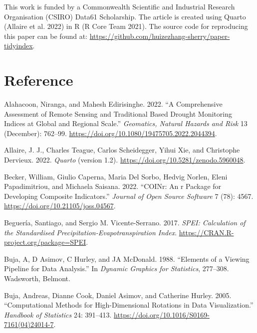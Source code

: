 \documentclass[
]{interact}
\newlength{\cslhangindent}
\newlength{\cslentryspacingunit} %
\newenvironment{CSLReferences}[2] %
 {%
  \setlength{\parindent}{0pt}
  \ifodd #1
  \let\oldpar\par
  \def\par{\hangindent=\cslhangindent\oldpar}
  \fi
  \setlength{\parskip}{#2\cslentryspacingunit}
 }%
 {}
\begin{document}
This work is funded by a Commonwealth Scientific and Industrial Research
Organisation (CSIRO) Data61 Scholarship. The article is created using
Quarto (Allaire et al. 2022) in R (R Core Team 2021). The source code
for reproducing this paper can be found at:
\url{https://github.com/huizezhang-sherry/paper-tidyindex}.

\hypertarget{reference}{%
\section*{Reference}\label{reference}}

\hypertarget{refs}{}
\begin{CSLReferences}{1}{0}
\leavevmode{}%
Alahacoon, Niranga, and Mahesh Edirisinghe. 2022. {``A Comprehensive
Assessment of Remote Sensing and Traditional Based Drought Monitoring
Indices at Global and Regional Scale.''} \emph{Geomatics, Natural
Hazards and Risk} 13 (December): 762--99.
\url{https://doi.org/10.1080/19475705.2022.2044394}.

\leavevmode{}%
Allaire, J. J., Charles Teague, Carlos Scheidegger, Yihui Xie, and
Christophe Dervieux. 2022. \emph{{Quarto}} (version 1.2).
\url{https://doi.org/10.5281/zenodo.5960048}.

\leavevmode{}%
Becker, William, Giulio Caperna, Maria Del Sorbo, Hedvig Norlen, Eleni
Papadimitriou, and Michaela Saisana. 2022. {``COINr: An r Package for
Developing Composite Indicators.''} \emph{Journal of Open Source
Software} 7 (78): 4567. \url{https://doi.org/10.21105/joss.04567}.

\leavevmode{}%
Beguería, Santiago, and Sergio M. Vicente-Serrano. 2017. \emph{SPEI:
Calculation of the Standardised Precipitation-Evapotranspiration Index}.
\url{https://CRAN.R-project.org/package=SPEI}.

\leavevmode{}%
Buja, A, D Asimov, C Hurley, and JA McDonald. 1988. {``Elements of a
Viewing Pipeline for Data Analysis.''} In \emph{Dynamic Graphics for
Statistics}, 277--308. Wadsworth, Belmont.

\leavevmode{}%
Buja, Andreas, Dianne Cook, Daniel Asimov, and Catherine Hurley. 2005.
{``Computational Methods for High-Dimensional Rotations in Data
Visualization.''} \emph{Handbook of Statistics} 24: 391--413.
\url{https://doi.org/10.1016/S0169-7161(04)24014-7}.


\end{CSLReferences}
\end{document}
